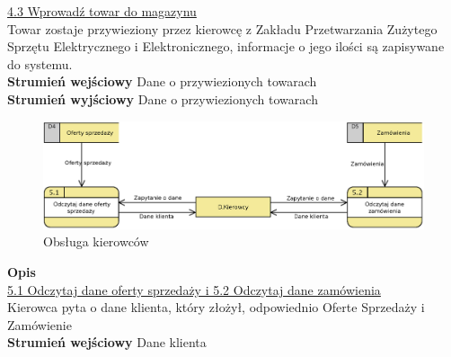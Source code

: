 	\underline{4.3 Wprowadź towar do magazynu}\\
	Towar zostaje przywieziony przez kierowcę z Zakładu Przetwarzania Zużytego Sprzętu Elektrycznego i Elektronicznego, informacje o jego ilości są zapisywane do systemu.\\
	\textbf{Strumień wejściowy} Dane o przywiezionych towarach\\
	\textbf{Strumień wyjściowy} Dane o przywiezionych towarach\\

	\begin{figure}[H]
		\centering
		\centerline{\includegraphics[width=1.1\textwidth]{img/DFD/2-level-kierowcy.eps}}
		\caption{Obsługa kierowców}
	\end{figure}
	
	\textbf{Opis} \\
	\underline{5.1 Odczytaj dane oferty sprzedaży i 5.2 Odczytaj dane zamówienia}\\
	Kierowca pyta o dane klienta, który złożył, odpowiednio Oferte Sprzedaży i Zamówienie\\
	\textbf{Strumień wejściowy} Dane klienta\\